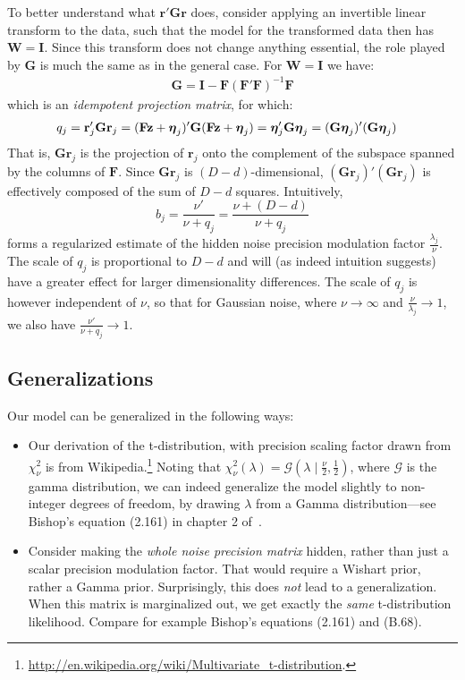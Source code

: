 \documentclass[a4paper,oneside,12pt,english]{report}
\def\zvec{\mathbf{z}}
\def\Wmat{\mathbf{W}}
\def\Fmat{\mathbf{F}}
\def\Gmat{\mathbf{G}}
\def\Imat{\mathbf{I}}
\def\Gmat{\mathbf{G}}
\def\rvec{\mathbf{r}}
\begin{document}
To better understand what $\rvec'\Gmat\rvec$ does, consider applying an invertible linear transform to the data, such that the model for the transformed data then has $\Wmat=\Imat$. Since this transform does not change anything essential, the role played by $\Gmat$ is much the same as in the general case. For $\Wmat=\Imat$ we have:
\begin{align*}
\Gmat=\Imat - \Fmat(\Fmat'\Fmat)^{-1}\Fmat
\end{align*}
which is an \emph{idempotent projection matrix}, for which:
\begin{align*}
q_j &= \rvec_j'\Gmat\rvec_j = (\Fmat\zvec+\etavec_j)'\Gmat(\Fmat\zvec+\etavec_j) = \etavec_j'\Gmat\etavec_j = (\Gmat\etavec_j)'(\Gmat\etavec_j)
\end{align*}
That is, $\Gmat\rvec_j$ is the projection of $\rvec_j$ onto the complement of the subspace spanned by the columns of $\Fmat$. Since $\Gmat\rvec_j$ is $(D-d)$-dimensional, $(\Gmat\rvec_j)'(\Gmat\rvec_j)$ is effectively composed of the sum of $D-d$ squares. Intuitively, 
$$b_j=\frac{\nu'}{\nu+q_j}=\frac{\nu+(D-d)}{\nu+q_j}$$ 
forms a regularized estimate of the hidden noise precision modulation factor $\frac{\lambda_j}{\nu}$. The scale of $q_j$ is proportional to $D-d$ and will (as indeed intuition suggests) have a greater effect for larger dimensionality differences. The scale of $q_j$ is however independent of $\nu$, so that for Gaussian noise, where $\nu\to\infty$ and $\frac{\nu}{\lambda_j}\to1$, we also have $\frac{\nu'}{\nu+q_j}\to1$. 


\subsection{Generalizations}
\def\GD{\mathcal{G}}
Our model can be generalized in the following ways:
\begin{itemize}
	\item Our derivation of the t-distribution, with precision scaling factor drawn from $\chi^2_\nu$ is from Wikipedia.\footnote{\url{http://en.wikipedia.org/wiki/Multivariate_t-distribution}.} Noting that $\chi^2_\nu(\lambda)=\GD(\lambda\mid\tfrac{\nu}{2},\tfrac12)$, where $\GD$ is the gamma distribution, we can indeed generalize the model slightly to non-integer degrees of freedom, by drawing $\lambda$ from a Gamma distribution---see Bishop's equation (2.161) in chapter 2 of~\cite{PRML}. 
%
	\item Consider making the \emph{whole noise precision matrix} hidden, rather than just a scalar precision modulation factor. That would require a Wishart prior, rather a Gamma prior. Surprisingly, this does \emph{not} lead to a generalization. When this matrix is marginalized out, we get exactly the \emph{same} t-distribution likelihood. Compare for example Bishop's equations (2.161) and (B.68).
\end{itemize}
\end{document}
